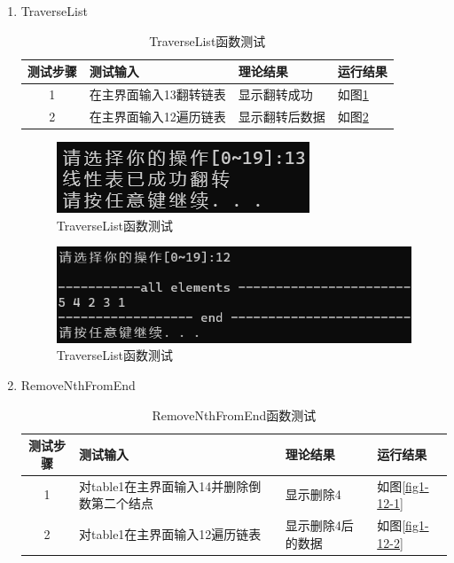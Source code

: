 \documentclass[supercite]{Experimental_Report}
\theoremstyle{definition}
\begin{document}
\begin{enumerate}
	
	\item TraverseList
	
	\begin{table}[h!]
		\begin{center}
			\caption{ TraverseList函数测试}
			\begin{tabular}{|c|p{4cm}<{\centering}|p{4cm}<{\centering}|p{4cm}<{\centering}|} 
				\hline
				\textbf{测试步骤} & \textbf{测试输入} & \textbf{理论结果} & \textbf{运行结果} \\
				\hline
				1 & 在主界面输入13翻转链表 & 显示翻转成功 & 如图\ref{fig1-11-1}\\
				\hline
				2 & 在主界面输入12遍历链表 & 显示翻转后数据 & 如图\ref{fig1-11-2}\\
				\hline
			\end{tabular}
		\end{center}
	\end{table}
	
	
	\begin{figure}[H] %
		\begin{center}
			\includegraphics[width=0.5\linewidth]{images/linklist/13-1.png}
			\caption{ TraverseList函数测试}
			\label{fig1-11-1}
		\end{center}
	\end{figure}

	\begin{figure}[H] %
		\begin{center}
			\includegraphics[width=0.5\linewidth]{images/linklist/13-12.png}
			\caption{ TraverseList函数测试}
			\label{fig1-11-2}
		\end{center}
	\end{figure}
	
	\item RemoveNthFromEnd
	
	\begin{table}[h!]
		\begin{center}
			\caption{ RemoveNthFromEnd函数测试}
			\begin{tabular}{|c|p{4cm}<{\centering}|p{4cm}<{\centering}|p{4cm}<{\centering}|} 
				\hline
				\textbf{测试步骤} & \textbf{测试输入} & \textbf{理论结果} & \textbf{运行结果} \\
				\hline
				1 & 对table1在主界面输入14并删除倒数第二个结点 & 显示删除4 & 如图\ref{fig1-12-1}\\
				\hline
				2 & 对table1在主界面输入12遍历链表 & 显示删除4后的数据 & 如图\ref{fig1-12-2}\\
				\hline
			\end{tabular}
		\end{center}
	\end{table}
	

\end{enumerate}
\end{document}
